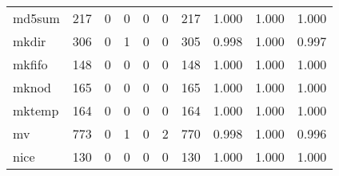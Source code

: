 \begin{longtable}{lp{1.3cm}p{1.3cm}p{1.3cm}p{1.3cm}p{1.3cm}p{1.3cm}p{1.3cm}p{1.3cm}p{1.3cm}}
md5sum    &                    217 &                                  0 &                                 0 &                                0 &                                 0 &                             217 &                                   1.000 &                                  1.000 &                                1.000 \\
mkdir     &                    306 &                                  0 &                                 1 &                                0 &                                 0 &                             305 &                                   0.998 &                                  1.000 &                                0.997 \\
mkfifo    &                    148 &                                  0 &                                 0 &                                0 &                                 0 &                             148 &                                   1.000 &                                  1.000 &                                1.000 \\
mknod     &                    165 &                                  0 &                                 0 &                                0 &                                 0 &                             165 &                                   1.000 &                                  1.000 &                                1.000 \\
mktemp    &                    164 &                                  0 &                                 0 &                                0 &                                 0 &                             164 &                                   1.000 &                                  1.000 &                                1.000 \\
mv        &                    773 &                                  0 &                                 1 &                                0 &                                 2 &                             770 &                                   0.998 &                                  1.000 &                                0.996 \\
nice      &                    130 &                                  0 &                                 0 &                                0 &                                 0 &                             130 &                                   1.000 &                                  1.000 &                                1.000 \\

\end{longtable}
